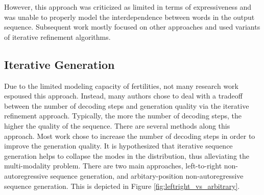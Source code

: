 However, this approach was criticized as limited in terms of expressiveness \cite{ma_flowseq_2019} and was unable to properly model the interdependence between words in the output sequence. Subsequent work mostly focused on other approaches and used variants of iterative refinement algorithms. 

\subsection{Iterative Generation} \label{subsec:sol3_iterative_generation}
Due to the limited modeling capacity of fertilities, not many research work espoused this approach. Instead, many authors chose to deal with a tradeoff between the number of decoding steps and generation quality via the iterative refinement approach. Typically, the more the number of decoding steps, the higher the quality of the sequence. There are several methods along this approach. Most work chose to increase the number of decoding steps in order to improve the generation quality. It is hypothesized \cite{ghazvininejad_mask-predict_2019} that iterative sequence generation helps to collapse the modes in the distribution, thus alleviating the multi-modality problem. There are two main approaches, left-to-right non-autoregressive sequence generation, and arbitary-position non-autoregressive sequence generation. This is depicted in Figure \ref{fig:leftright_vs_arbitrary}.


